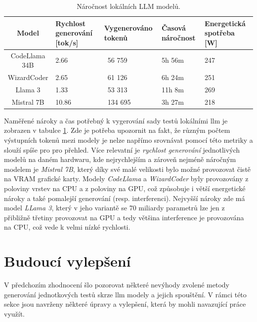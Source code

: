 \documentclass[czech, ma, kiv, he, iso690numb, pdf, viewonly]{fasthesis}
\begin{document}
    \begin{table}[H]
        \begin{tabular}{|c|p{2.5cm}|p{2.5cm}|p{2cm}|p{2cm}|}
            \hline
            \textbf{Model} & \textbf{Rychlost \linebreak generování} [tok/s] & \textbf{Vygenerováno tokenů} & \textbf{Časová \linebreak náročnost} & \textbf{Energetická spotřeba} [W] \\
            \hline
            CodeLlama 34B & 2.66 & 56 759 & 5h 56m & 247 \\
            \hline
            WizardCoder & 2.65 & 61 126 & 6h 24m & 251 \\
            \hline
            Llama 3 & 1.33 & 53 313 & 11h 8m & 269 \\
            \hline
            Mistral 7B & 10.86 & 134 695 & 3h 27m & 218 \\
            \hline
        \end{tabular}
        \centering
        \caption{Náročnost lokálních LLM modelů.}
        \label{tab:eval:local}
    \end{table}
 
    Naměřené nároky a čas potřebný k vygerování sady testů lokálními \Gls{llm} je zobrazen v tabulce \ref{tab:eval:local}. Zde je potřeba upozornit na fakt, že různým počtem výstupních tokenů mezi modely je nelze napřímo srovnávat pomocí této metriky a slouží spíše pro pro přehled. Více relevatní je \textit{rychlost generování} jednotlivých modelů na daném hardwaru, kde nejrychlejším a zároveň nejméně náročným modelem je \textit{Mistral 7B}, který díky své malé velikosti bylo možné provozovat čistě na VRAM grafické karty. Modely \textit{CodeLlama} a \textit{WizardCoder} byly provozovány z poloviny vrstev na CPU a z poloviny na GPU, což způsobuje i větší energetické nároky a také pomalejší generování (resp. interferenci). Nejvyšší nároky zde má model \textit{LLama 3}, který v jeho variantě se 70 miliardy parametrů lze jen z přibližně třetiny provozovat na GPU a tedy většina interference je provozována na CPU, což vede k velmi nízké rychlosti.

\chapter{Budoucí vylepšení} \label{sec:future_work}

    V předchozím zhodnocení šlo pozorovat některé nevýhody zvolené metody generování jednotkových testů skrze \Gls{llm} modely a jejich spouštění. V rámci této sekce jsou navrženy některé úpravy a vylepšení, která by mohli navazující práce využít.
\end{document}
